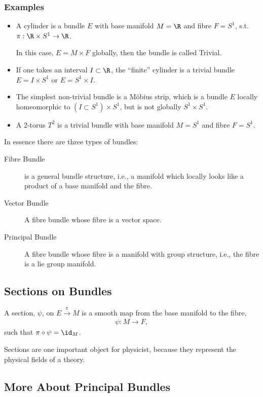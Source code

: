 \subsubsection*{Examples}
\begin{itemize}
\item A cylinder is a bundle $E$ with base manifold $M=\R$ and fibre $F=S^1$, s.t. $\pi:\R\times S^1\to \R$.

In this case, $E=M\times F$ globally, then the bundle is called {\sc Trivial}.
\item If one takes an interval $I\subset \R$, the ``finite'' cylinder is a trivial bundle $E=I\times S^1$ or $E=S^1\times I$.
\item The simplest non-trivial bundle is a M\"obius strip, which is a bundle $E$ locally homeomorphic to $(I\subset S^1)\times S^1$, but is not globally $S^1\times S^1$.
\item  A 2-torus $T^2$ is a trivial bundle with base manifold $M=S^1$ and fibre $F=S^1$.
\end{itemize}

In essence there are three types of bundles:
\begin{description}
\item [Fibre Bundle] is a general bundle structure, i.e., a manifold which locally looks like a product of a base manifold and the fibre.
\item [Vector Bundle] A fibre bundle whose fibre is a vector space.
\item [Principal Bundle] A fibre bundle whose fibre is a manifold with group structure, i.e., the fibre is a lie group manifold.
\end{description}

\subsection{Sections on Bundles}

A section, $\psi$, on $E\xrightarrow{\pi}M$ is a smooth map from the base manifold to the fibre,
\begin{align}
  \psi:M\to F,
\end{align}
such that $\pi\circ\psi= \id_M$.

Sections are one important object for physicist, because they represent the physical fields of a theory.

\subsection{More About Principal Bundles}

